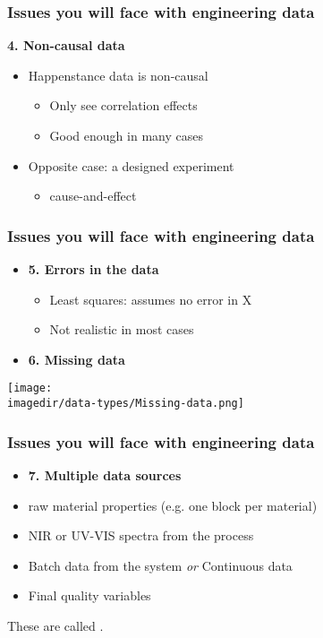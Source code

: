\begin{frame}\frametitle{Issues you will face with engineering data}

	\textbf{4. Non-causal data}
	\begin{itemize}
		\item	Happenstance data is non-causal
		\begin{itemize}
			\item	Only see correlation effects
			\item	Good enough in many cases
		\end{itemize}
		\item	Opposite case: a designed experiment
		\begin{itemize}
			\item	cause-and-effect
		\end{itemize}
	\end{itemize}
\end{frame}

\begin{frame}\frametitle{Issues you will face with engineering data}
	\begin{itemize}
		\item	\textbf{5. Errors in the data}
		\begin{itemize}
			\item	Least squares: assumes no error in X
			\item	Not realistic in most cases
		\end{itemize}
	\end{itemize}
	\begin{itemize}
		\item	\textbf{6. Missing data}
	\end{itemize}

	\texttt{[image: \\imagedir/data-types/Missing-data.png]}
\end{frame}

\begin{frame}\frametitle{Issues you will face with engineering data}
	\begin{itemize}
		\item	\textbf{7. Multiple data sources}
	\end{itemize}
	\begin{itemize}
		\item	raw material properties (e.g. one block per material)
		\item	NIR or UV-VIS spectra from the process
		\item	Batch data from the system \emph{or} Continuous data
		\item	Final quality variables
	\end{itemize}
	
	\vspace{12pt}
	These are called {\color{purple}{multiblock data sets}}.
\end{frame}

